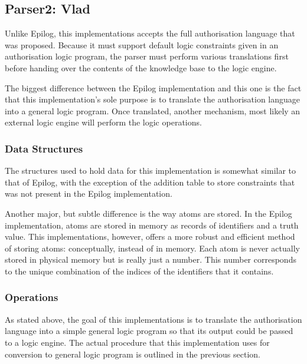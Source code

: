 \documentclass[a4paper]{article}
\begin{document}
    \subsection{Parser2: Vlad}

      Unlike Epilog, this implementations accepts the full authorisation
      language that was proposed. Because it must support default logic
      constraints given in an authorisation logic program, the parser must
      perform various translations first before handing over the contents
      of the knowledge base to the logic engine.

      The biggest difference between the Epilog implementation and this one
      is the fact that this implementation's sole purpose is to translate
      the authorisation language into a general logic program. Once translated,
      another mechanism, most likely an external logic engine will perform
      the logic operations.

      \subsubsection{Data Structures}

        The structures used to hold data for this implementation is somewhat
        similar to that of Epilog, with the exception of the addition table
        to store constraints that was not present in the Epilog implementation.

        Another major, but subtle difference is the way atoms are stored. In 
        the Epilog implementation, atoms are stored in memory as records of
        identifiers and a truth value. This implementations, however, offers
        a more robust and efficient method of storing atoms: conceptually,
        instead of in memory. Each atom is never actually stored in physical
        memory but is really just a number. This number corresponds to the
        unique combination of the indices of the identifiers that it contains.

      \subsubsection{Operations}

        As stated above, the goal of this implementations is to translate
        the authorisation language into a simple general logic program
        so that its output could be passed to a logic engine. The actual
        procedure that this implementation uses for conversion to general
        logic program is outlined in the previous section.
\end{document}
